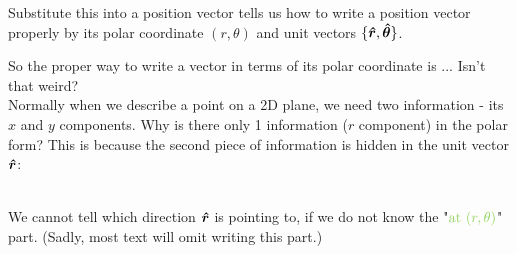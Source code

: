 \documentclass[class=article, crop=false, 12pt]{standalone}
\begin{document}
Substitute this into a position vector tells us how to write a position vector properly
 by its polar coordinate $(r, \theta)$ and unit vectors $\{\vu*{r}, \vu*{\theta}\}$.

So the proper way to write a vector in terms of its polar coordinate is 
...  Isn't that weird?\\

Normally when we describe a point on a 2D plane, 
we need two information - its $x$ and $y$ components.
Why is there only 1 information ($r$ component) in the polar form? 
This is because the second piece of information is hidden in the unit vector $\vu*{r}$:

\hfill\\
We cannot tell which direction $\vu*{r}$ is pointing to, 
if we do not know the "$\green{\text{at }(r,\theta)}$" part. 
(Sadly, most text will omit writing this part.)
\end{document}

